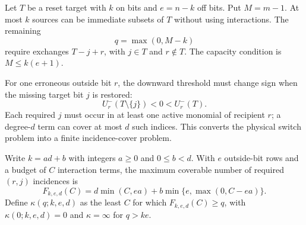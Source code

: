 \documentclass[12pt,letterpaper]{article}
\theoremstyle{definition}\newtheorem{definition}[theorem]{Definition}
\theoremstyle{remark}\newtheorem{remark}[theorem]{Remark}
\begin{document}
Let $T$ be a reset target with $k$ on bits and $e=n-k$ off bits. Put $M=m-1$. At most $k$ sources can be immediate subsets of $T$ without using interactions. The remaining
\begin{equation}\label{eq:qdef}
 q=\max(0,M-k)
\end{equation}
require exchanges $T-j+r$, with $j\in T$ and $r\notin T$. The capacity condition is $M\le k(e+1)$.

For one erroneous outside bit $r$, the downward threshold must change sign when the missing target bit $j$ is restored:
\begin{equation}\label{eq:thresholdjump}
 U_r^-(T\setminus\{j\})<0<U_r^-(T).
\end{equation}
Each required $j$ must occur in at least one active monomial of recipient $r$; a degree-$d$ term can cover at most $d$ such indices. This converts the physical switch problem into a finite incidence-cover problem.

Write $k=ad+b$ with integers $a\ge0$ and $0\le b<d$. With $e$ outside-bit rows and a budget of $C$ interaction terms, the maximum coverable number of required $(r,j)$ incidences is
\begin{equation}\label{eq:F}
 F_{k,e,d}(C)=d\min(C,ea)+b\min\{e,\max(0,C-ea)\}.
\end{equation}
Define $\kappa(q;k,e,d)$ as the least $C$ for which $F_{k,e,d}(C)\ge q$, with $\kappa(0;k,e,d)=0$ and $\kappa=\infty$ for $q>ke$.
\end{document}
